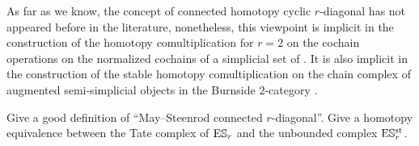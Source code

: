 \begin{example}
	As far as we know, the concept of connected homotopy cyclic $r$-diagonal has not appeared before in the literature, nonetheless, this viewpoint is implicit in the construction of the homotopy comultiplication for $r=2$ on the cochain operations on the normalized cochains of a simplicial set of \cite{medina2021fast_sq}.
	It is also implicit in the construction of the stable homotopy comultiplication on the chain complex of augmented semi-simplicial objects in the Burnside $2$-category \cite{cantero-moran2020khovanov}.
\end{example}

\begin{question}
	Give a good definition of ``May--Steenrod connected $r$-diagonal''.
	Give a homotopy equivalence between the Tate complex of $\mathrm{E}\mathbb{S}_r$ and the unbounded complex $\mathrm{E}\mathbb{S}^{\mathrm{st}}_r$.
\end{question}

